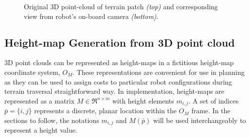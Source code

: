 				\begin{figure}[!h]
					\centering
					\caption{Original 3D point-cloud of terrain patch \emph{(top)} and corresponding view from robot's on-board camera \emph{(bottom)}.}
					\label{fig::pointcloud_terrain_patch}
				\end{figure}


		\subsection{Height-map Generation from 3D point cloud}
			
			3D point clouds can be represented as height-maps in a fictitious height-map coordinate system, $O_{M}$. These representations are convenient for use in planning as they can be used to assign costs to particular robot configurations during terrain traversal straightforward way. In implementation, height-maps are represented as a matrix  $M\in \Re^{n\times m}$ with height elements $m_{i,j}$. A set of indices $\bar{p} = \{i,j\}$ represents a discrete, planar location within the $O_{M}$ frame. In the sections to follow, the notations $m_{i,j}$ and $M(\bar{p})$ will be used interchangeably to represent a height value. 

